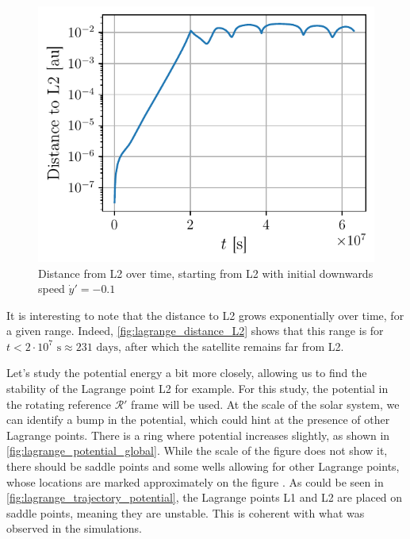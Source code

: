 \begin{figure}
    \vspace*{-0.4cm}
    \centering
    \includegraphics[width=\linewidth]{figures/lagrange_exponential_distance.pdf}
    \caption{Distance from L2 over time, starting from L2 with initial downwards speed \(\dot y' = -0.1\)}
    \label{fig:lagrange_distance_L2}
    \vspace*{-0.5cm}
\end{figure}
It is interesting to note that the distance to L2 grows exponentially over time, for a given range. Indeed, \autoref{fig:lagrange_distance_L2} shows that this range is for \(t < 2 \cdot 10^7 \textrm{ s} \approx 231 \textrm{ days}\), after which the satellite remains far from L2.

Let's study the potential energy a bit more closely, allowing us to find the stability of the Lagrange point L2 for example. For this study, the potential in the rotating reference \(\mathcal R'\) frame will be used. At the scale of the solar system, we can identify a bump in the potential, which could hint at the presence of other Lagrange points. There is a ring where potential increases slightly, as shown in \autoref{fig:lagrange_potential_global}. While the scale of the figure does not show it, there should be saddle points and some wells allowing for other Lagrange points, whose locations are marked approximately on the figure \cite{lagrange}. As could be seen in \autoref{fig:lagrange_trajectory_potential}, the Lagrange points L1 and L2 are placed on saddle points, meaning they are unstable. This is coherent with what was observed in the simulations.

